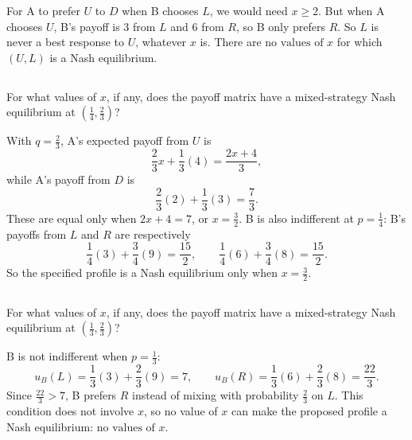 \documentclass[newpages]{assignment}
\begin{document}
\begin{solution}
    For A to prefer \(U\) to \(D\) when B chooses \(L\), we would need
    \(x\geq 2\). But when A chooses \(U\), B's payoff is \(3\) from \(L\)
    and \(6\) from \(R\), so B only prefers \(R\). So \(L\) is never
    a best response to \(U\), whatever \(x\) is. There are
    \(\boxed{\text{no values of }x}\) for which \((U,L)\) is a Nash
    equilibrium.
\end{solution}

\subsection{}

\begin{problem}
    For what values of \(x\), if any, does the payoff matrix have a mixed-strategy
    Nash equilibrium at \(\left(\frac{1}{4}, \frac{2}{3}\right)\)?
\end{problem}

\begin{solution}
    With \(q=\frac{2}{3}\), A's expected payoff from \(U\) is
    \[
        \frac{2}{3}x+\frac{1}{3}(4)=\frac{2x+4}{3},
    \]
    while A's payoff from \(D\) is
    \[
        \frac{2}{3}(2)+\frac{1}{3}(3)=\frac{7}{3}.
    \]
    These are equal only when \(2x+4=7\), or \(x=\frac{3}{2}\).
    B is also indifferent at \(p=\frac{1}{4}\): B's payoffs from \(L\)
    and \(R\) are respectively
    \[
        \frac14(3)+\frac34(9)=\frac{15}{2},
        \qquad
        \frac14(6)+\frac34(8)=\frac{15}{2}.
    \]
    So the specified profile is a Nash equilibrium only when
    \(\boxed{x=\frac{3}{2}}\).
\end{solution}

\subsection{}

\begin{problem}
    For what values of \(x\), if any, does the payoff matrix have a mixed-strategy
    Nash equilibrium at \(\left(\frac{1}{3}, \frac{2}{3}\right)\)?
\end{problem}

\begin{solution}
    B is not indifferent when \(p=\frac{1}{3}\):
    \[
        u_B(L)=\frac13(3)+\frac23(9)=7,\qquad
        u_B(R)=\frac13(6)+\frac23(8)=\frac{22}{3}.
    \]
    Since \(\frac{22}{3}>7\), B prefers \(R\) instead of mixing
    with probability \(\frac{2}{3}\) on \(L\). This condition does not
    involve \(x\), so no value of \(x\) can make the proposed profile a
    Nash equilibrium: \(\boxed{\text{no values of }x}\).
\end{solution}
\end{document}
